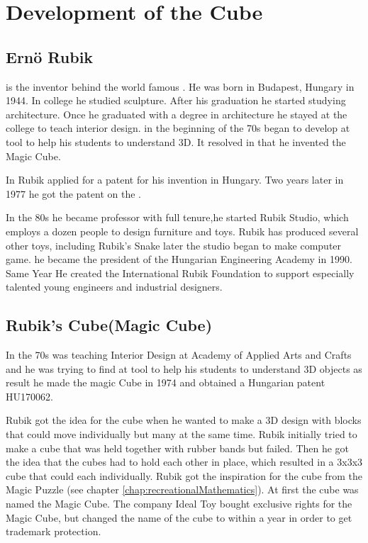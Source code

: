 \chapter{Development of the Cube}
\section{Ern\"{o} Rubik}
\erno{} is the inventor behind the world famous \rubik{}. He was born in Budapest, Hungary in 1944.  In college he studied sculpture. After his graduation he started studying architecture.  Once he graduated with a degree in architecture he stayed at the college to teach interior design. in the beginning of the 70s began to develop at tool to help his students to understand 3D. It resolved in that he invented the Magic Cube.

In  Rubik applied for a patent for his invention in Hungary. Two years later in 1977 he got the patent on the \rubik{}.


In the 80s he became professor with full tenure,he started Rubik Studio, which employs a dozen people to design furniture and toys. Rubik has produced several other toys, including Rubik's Snake later the studio began to make computer game. he became the president of the Hungarian Engineering Academy in 1990. Same Year He created the International Rubik Foundation to support especially talented young engineers and industrial designers.
 
\section{Rubik's Cube(Magic Cube)}

 In the 70s \erno{} was teaching Interior Design at Academy of Applied Arts and Crafts and he was trying to find at tool to help his students to understand 3D objects as result he made the magic Cube in 1974 and obtained a Hungarian patent HU170062. 
 
 Rubik got the idea for the cube when he wanted to make a 3D design with blocks that could move individually but many at the same time. Rubik initially tried  to make a cube that was held together with rubber bands but failed. Then he got the idea that the cubes had to hold each other in place, which resulted in a 3x3x3 cube that could \twist{} each \face{} individually. Rubik got the inspiration for the cube from the Magic Puzzle (see chapter \ref{chap:recreationalMathematics}). At first the cube was named the Magic Cube. The company Ideal Toy bought exclusive rights for the Magic Cube, but changed the name of the cube to \rubik{} within a year in order to get trademark protection.

